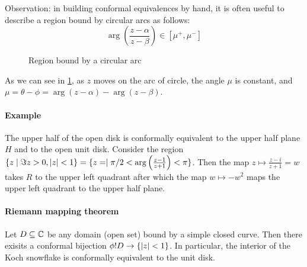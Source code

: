 Observation: in building conformal equivalences by hand, it is often useful to describe a region bound by circular arcs as follows:
\[
\arg\left(\frac{z-\alpha}{z-\beta}\right) \in [\mu^+, \mu^-]
\]
\begin{figure}
  \centering
  \caption{Region bound by a circular arc}
  \label{fig:region_bound_by_circular_arc}
\end{figure}
As we can see in \cref{fig:region_bound_by_circular_arc}, as $z$ moves on the arc of circle, the angle $\mu$ is constant, and $\mu = \theta - \phi = \arg ( z - \alpha ) - \arg ( z - \beta )$.

\paragraph{Example}
The upper half of the open disk is conformally equivalent to the upper half plane $H$ and to the open unit disk. 
Consider the region $\{ z \mid \Im z > 0, \lvert z\rvert < 1 \} = \{ z = \mid \pi/2 < \arg \left(\frac{z-1}{z+1}\right) < \pi\}$. Then the map $z \mapsto \frac{z-i}{z+1} = w$ takes $R$ to the upper left quadrant after which the map $w \mapsto -w^2$ maps the upper left quadrant to the upper half plane.

\paragraph{Riemann mapping theorem}
Let $D \subseteq \mathbb{C}$ be any domain (open set) bound by a simple closed curve. Then there exisits a conformal bijection $\phi ! D \rightarrow \{ \lvert z\rvert < 1 \}$. In particular, the interior of the Koch snowflake is conformally equivalent to the unit disk.




